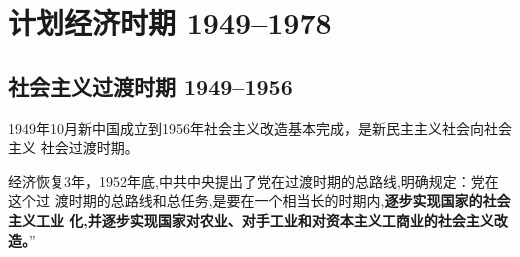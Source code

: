 \chapter{计划经济时期 1949--1978}

\section{社会主义过渡时期 1949--1956}
\label{sec:hongguodu}

1949年10月新中国成立到1956年社会主义改造基本完成，是新民主主义社会向社会主义
社会过渡时期。

经济恢复3年，1952年底,中共中央提出了党在过渡时期的总路线,明确规定：党在这个过
渡时期的总路线和总任务,是要在一个相当长的时期内,\textbf{逐步实现国家的社会主义工业
  化,并逐步实现国家对农业、对手工业和对资本主义工商业的社会主义改造。}”

